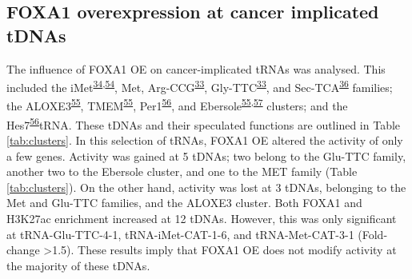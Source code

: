 \documentclass[
  12pt,
]{article}
\begin{document}
\hypertarget{foxa1-overexpression-at-cancer-implicated-tdnas}{%
\subsection{FOXA1 overexpression at cancer implicated tDNAs}\label{foxa1-overexpression-at-cancer-implicated-tdnas}}

The influence of FOXA1 OE on cancer-implicated tRNAs was analysed.
This included the iMet\textsuperscript{\protect\hyperlink{ref-Pavon-Eternod2013}{34},\protect\hyperlink{ref-Wang2018}{54}}, Met, Arg-CCG\textsuperscript{\protect\hyperlink{ref-Goodarzi2016}{33}}, Gly-TTC\textsuperscript{\protect\hyperlink{ref-Goodarzi2016}{33}}, and Sec-TCA\textsuperscript{\protect\hyperlink{ref-Sangha2022}{36}} families; the ALOXE3\textsuperscript{\protect\hyperlink{ref-sizer2022}{55}}, TMEM\textsuperscript{\protect\hyperlink{ref-sizer2022}{55}}, Per1\textsuperscript{\protect\hyperlink{ref-raab2011}{56}}, and Ebersole\textsuperscript{\protect\hyperlink{ref-sizer2022}{55},\protect\hyperlink{ref-Ebersole2011}{57}} clusters; and the Hes7\textsuperscript{\protect\hyperlink{ref-raab2011}{56}}tRNA.
These tDNAs and their speculated functions are outlined in Table \ref{tab:clusters}.
In this selection of tRNAs, FOXA1 OE altered the activity of only a few genes.
Activity was gained at 5 tDNAs; two belong to the Glu-TTC family, another two to the Ebersole cluster, and one to the MET family (Table \ref{tab:clusters}).
On the other hand, activity was lost at 3 tDNAs, belonging to the Met and Glu-TTC families, and the ALOXE3 cluster.
Both FOXA1 and H3K27ac enrichment increased at 12 tDNAs.
However, this was only significant at tRNA-Glu-TTC-4-1, tRNA-iMet-CAT-1-6, and tRNA-Met-CAT-3-1 (Fold-change \textgreater1.5).
These results imply that FOXA1 OE does not modify activity at the majority of these tDNAs.

\begingroup\fontsize{10}{12}\selectfont
\end{document}

